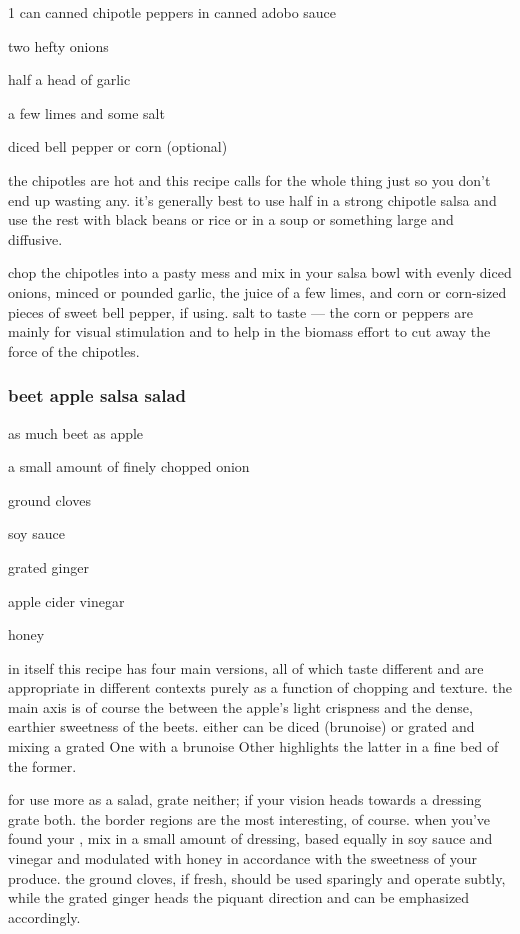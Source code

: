 \begin{ingredients}
  \item 1 can canned chipotle peppers in canned adobo sauce
  \item two hefty onions
  \item half a head of garlic
  \item a few limes and some salt
  \item diced bell pepper or corn (optional)
\end{ingredients}

the chipotles are hot and this recipe calls for the whole thing just
so you don't end up wasting any. it's generally best to use half in a
strong chipotle salsa and use the rest with black beans or rice or in
a soup or something large and diffusive.

chop the chipotles into a pasty mess and mix in your salsa bowl with
evenly diced onions, minced or pounded garlic, the juice of a few
limes, and corn or corn-sized pieces of sweet bell pepper, if
using. salt to taste --- the corn or peppers are mainly for visual
stimulation and to help in the biomass effort to cut away the force of
the chipotles.

\subsubsection{beet apple salsa salad}

\begin{ingredients}
  \item as much beet as apple
  \item a small amount of finely chopped onion
  \item ground cloves
  \item soy sauce
  \item grated ginger
  \item apple cider vinegar
  \item honey
\end{ingredients}

in itself this recipe has four main versions, all of which taste
different and are appropriate in different contexts purely as a
function of chopping and texture. the main axis is of course the
 between the apple's light crispness and the dense, earthier
sweetness of the beets. either can be diced (brunoise) or grated and
mixing a grated One with a brunoise Other highlights the latter in a
fine bed of the former.

for use more as a salad, grate neither; if your vision heads towards a
dressing grate both. the border regions are the most interesting, of
course. when you've found your , mix in a small amount of
dressing, based equally in soy sauce and vinegar and modulated with
honey in accordance with the sweetness of your produce. the ground
cloves, if fresh, should be used sparingly and operate subtly, while
the grated ginger heads the piquant direction and can be emphasized
accordingly.

